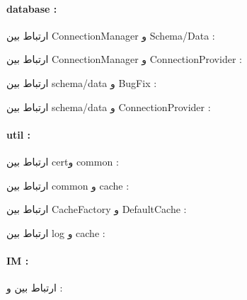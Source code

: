 




		\paragraph{database : } 

	\begin{itemize}	 

		 ارتباط بین ConnectionManager و Schema/Data :

		 ارتباط بین ConnectionManager و ConnectionProvider :

		 ارتباط بین schema/data و ‌‌BugFix :

		 ارتباط بین schema/data و ‌‌ConnectionProvider :

		

	\end{itemize}

		\paragraph{util : } 

	\begin{itemize}

		 ارتباط بین certو common :

		 ارتباط بین common و cache :

		 ارتباط بین CacheFactory و DefaultCache :

		 ارتباط بین log و ‌‌cache :

	\end{itemize}

		\paragraph{IM : } 

	\begin{itemize}

				 ارتباط بین  و  :

	\end{itemize}			

